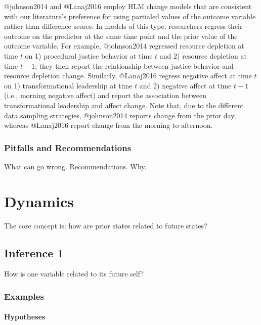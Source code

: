 \documentclass[]{article}
\let\oldparagraph\paragraph
\renewcommand{\paragraph}[1]{\oldparagraph{#1}\mbox{}}
\begin{document}
@johnson2014 and @Lanaj2016 employ HLM change models that are consistent
with our literature's preference for using partialed values of the
outcome variable rather than difference scores. In models of this type,
researchers regress their outcome on the predictor at the same time
point and the prior value of the outcome variable. For example,
@johnson2014 regressed resource depletion at time \(t\) on 1) procedural
justice behavior at time \(t\) and 2) resource depletion at time
\(t-1\); they then report the relationship between justice behavior and
resource depletion change. Similarly, @Lanaj2016 regress negative affect
at time \(t\) on 1) transformational leadership at time \(t\) and 2)
negative affect at time \(t-1\) (i.e., morning negative affect) and
report the association between transformational leadership and affect
change. Note that, due to the different data sampling strategies,
@johnson2014 reports change from the prior day, whereas @Lanaj2016
report change from the morning to afternoon.

\hypertarget{pitfalls-and-recommendations-6}{%
\subsubsection{Pitfalls and
Recommendations}\label{pitfalls-and-recommendations-6}}

What can go wrong. Recommendations. Why.

\hypertarget{dynamics}{%
\section{Dynamics}\label{dynamics}}

The core concept is: how are prior states related to future states?

\hypertarget{inference-1-3}{%
\subsection{Inference 1}\label{inference-1-3}}

How is one variable related to its future self?

\hypertarget{examples-7}{%
\subsubsection{Examples}\label{examples-7}}

\hypertarget{hypotheses-7}{%
\paragraph{Hypotheses}\label{hypotheses-7}}
\end{document}
